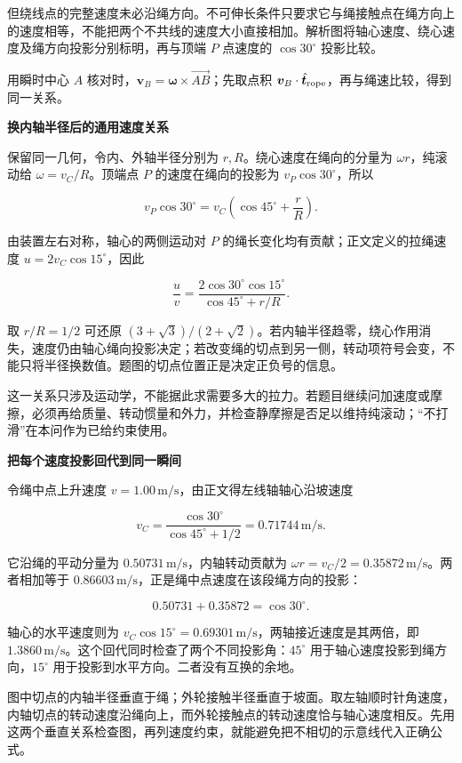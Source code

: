 \documentclass[12pt,a4paper,UTF8]{ctexart}
\begin{document}
但绕线点的完整速度未必沿绳方向。不可伸长条件只要求它与绳接触点在绳方向上的速度相等，不能把两个不共线的速度大小直接相加。解析图将轴心速度、绕心速度及绳方向投影分别标明，再与顶端
\(P\) 点速度的 \(\cos30^\circ\) 投影比较。

用瞬时中心 \(A\)
核对时，\(\bm v_B=\bm\omega\times\overrightarrow{AB}\)；先取点积
\(\bm v_B\cdot\hat{\bm t}_{\rm rope}\)，再与绳速比较，得到同一关系。

\textbf{换内轴半径后的通用速度关系}

保留同一几何，令内、外轴半径分别为 \(r,R\)。绕心速度在绳向的分量为
\(\omega r\)，纯滚动给 \(\omega=v_C/R\)。顶端点 \(P\)
的速度在绳向的投影为 \(v_P\cos30^\circ\)，所以

\[v_P\cos30^\circ=v_C\left(\cos45^\circ+\frac rR\right).\]

由装置左右对称，轴心的两侧运动对 \(P\)
的绳长变化均有贡献；正文定义的拉绳速度 \(u=2v_C\cos15^\circ\)，因此

\[\frac uv=\frac{2\cos30^\circ\cos15^\circ}{\cos45^\circ+r/R}.\]

取 \(r/R=1/2\) 可还原
\((3+\sqrt3)/(2+\sqrt2)\)。若内轴半径趋零，绕心作用消失，速度仍由轴心绳向投影决定；若改变绳的切点到另一侧，转动项符号会变，不能只将半径换数值。题图的切点位置正是决定正负号的信息。

这一关系只涉及运动学，不能据此求需要多大的拉力。若题目继续问加速度或摩擦，必须再给质量、转动惯量和外力，并检查静摩擦是否足以维持纯滚动；``不打滑''在本问作为已给约束使用。

\textbf{把每个速度投影回代到同一瞬间}

令绳中点上升速度 \(v=1.00\,\mathrm{m/s}\)，由正文得左线轴轴心沿坡速度

\[v_C=\frac{\cos30^\circ}{\cos45^\circ+1/2}=0.71744\,\mathrm{m/s}.\]

它沿绳的平动分量为 \(0.50731\,\mathrm{m/s}\)，内轴转动贡献为
\(\omega r=v_C/2=0.35872\,\mathrm{m/s}\)。两者相加等于
\(0.86603\,\mathrm{m/s}\)，正是绳中点速度在该段绳方向的投影：

\[0.50731+0.35872=\cos30^\circ.\]

轴心的水平速度则为
\(v_C\cos15^\circ=0.69301\,\mathrm{m/s}\)，两轴接近速度是其两倍，即
\(1.3860\,\mathrm{m/s}\)。这个回代同时检查了两个不同投影角：\(45^\circ\)
用于轴心速度投影到绳方向，\(15^\circ\)
用于投影到水平方向。二者没有互换的余地。

图中切点的内轴半径垂直于绳；外轮接触半径垂直于坡面。取左轴顺时针角速度，内轴切点的转动速度沿绳向上，而外轮接触点的转动速度恰与轴心速度相反。先用这两个垂直关系检查图，再列速度约束，就能避免把不相切的示意线代入正确公式。
\end{document}
